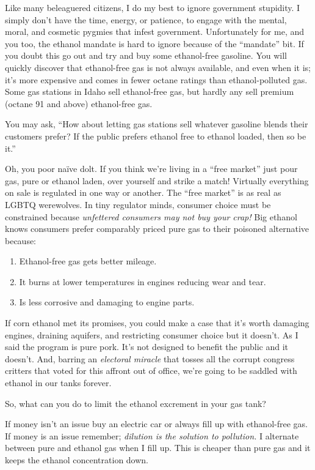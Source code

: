 Like many beleaguered citizens, I do my best to ignore government
stupidity. I simply don't have the time, energy, or patience, to engage
with the mental, moral, and cosmetic pygmies that infest government.
Unfortunately for me, and you too, the ethanol mandate is hard to ignore
because of the ``mandate'' bit. If you doubt this go out and try and buy
some ethanol-free gasoline. You will quickly discover that ethanol-free
gas is not always available, and even when it is; it's more expensive
and comes in fewer octane ratings than ethanol-polluted gas. Some gas
stations in Idaho sell ethanol-free gas, but hardly any sell premium
(octane 91 and above) ethanol-free gas.

You may ask, ``How about letting gas stations sell whatever gasoline
blends their customers prefer? If the public prefers ethanol free to
ethanol loaded, then so be it.''

Oh, you poor naïve dolt. If you think we're living in a ``free market''
just pour gas, pure or ethanol laden, over yourself and strike a match!
Virtually everything on sale is regulated in one way or another. The
``free market'' is as real as LGBTQ werewolves. In tiny regulator minds,
consumer choice must be constrained because \emph{unfettered consumers
may not buy your crap!} Big ethanol knows consumers prefer comparably
priced pure gas to their poisoned alternative because:

\begin{enumerate}
\def\labelenumi{\arabic{enumi}.}
\tightlist
\item
  Ethanol-free gas gets better mileage.
\item
  It burns at lower temperatures in engines reducing wear and tear.
\item
  Is less corrosive and damaging to engine parts.
\end{enumerate}

If corn ethanol met its promises, you could make a case that it's worth
damaging engines, draining aquifers, and restricting consumer choice but
it doesn't. As I said the program is pure pork. It's not designed to
benefit the public and it doesn't. And, barring an \emph{electoral
miracle} that tosses all the corrupt congress critters that voted for
this affront out of office, we're going to be saddled with ethanol in
our tanks forever.

So, what can you do to limit the ethanol excrement in your gas tank?

If money isn't an issue buy an electric car or always fill up with
ethanol-free gas. If money is an issue remember; \emph{dilution is the
solution to pollution.} I alternate between pure and ethanol gas when I
fill up. This is cheaper than pure gas and it keeps the ethanol
concentration down.

